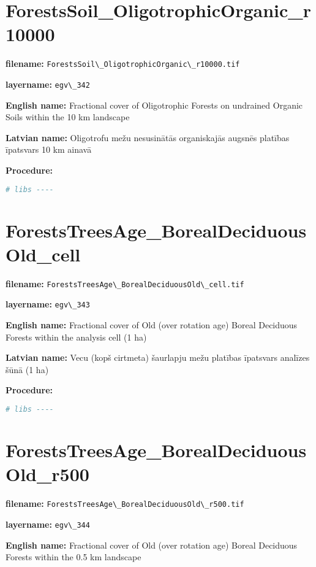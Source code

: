 \documentclass[
]{book}
\newcommand{\passthrough}[1]{#1}
\begin{document}
\section{ForestsSoil\_OligotrophicOrganic\_r10000}\label{ch06.342}

\textbf{filename:} \passthrough{\lstinline!ForestsSoil\_OligotrophicOrganic\_r10000.tif!}

\textbf{layername:} \passthrough{\lstinline!egv\_342!}

\textbf{English name:} Fractional cover of Oligotrophic Forests on undrained Organic Soils within the 10 km landscape

\textbf{Latvian name:} Oligotrofu mežu nesusinātās organiskajās augsnēs platības īpatsvars 10 km ainavā

\textbf{Procedure:}

\begin{lstlisting}[language=R]
# libs ----
\end{lstlisting}

\section{ForestsTreesAge\_BorealDeciduousOld\_cell}\label{ch06.343}

\textbf{filename:} \passthrough{\lstinline!ForestsTreesAge\_BorealDeciduousOld\_cell.tif!}

\textbf{layername:} \passthrough{\lstinline!egv\_343!}

\textbf{English name:} Fractional cover of Old (over rotation age) Boreal Deciduous Forests within the analysis cell (1 ha)

\textbf{Latvian name:} Vecu (kopš cirtmeta) šaurlapju mežu platības īpatsvars analīzes šūnā (1 ha)

\textbf{Procedure:}

\begin{lstlisting}[language=R]
# libs ----
\end{lstlisting}

\section{ForestsTreesAge\_BorealDeciduousOld\_r500}\label{ch06.344}

\textbf{filename:} \passthrough{\lstinline!ForestsTreesAge\_BorealDeciduousOld\_r500.tif!}

\textbf{layername:} \passthrough{\lstinline!egv\_344!}

\textbf{English name:} Fractional cover of Old (over rotation age) Boreal Deciduous Forests within the 0.5 km landscape
\end{document}
